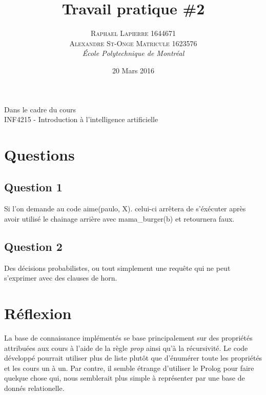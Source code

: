 \documentclass[a4paper, 12pt]{article} %
\title{Travail pratique \#2}
\author{\textsc{Raphael Lapierre 1644671\\
	        Alexandre St-Onge Matricule 1623576} %
\vspace{10pt}
\\{\textit{École Polytechnique de Montréal}}} %
\date{20 Mars 2016} %
\makeatletter
\renewcommand{\maketitle}{ %
\begin{center} %

\vspace*{25pt} %
{\LARGE\@title} %

\vspace{125pt} %

{\large\@author} %

\vspace{125pt} %
Dans le cadre du cours
\\INF4215 - Introduction à l'intelligence artificielle
\vspace{125pt} %
\\\@date %
\vspace{125pt} %

\end{center}
}
\makeatother
\begin{document}
\thispagestyle{empty}
\clearpage\maketitle %
\pagebreak[4]

\setlength{\headheight}{15.0pt}
\pagestyle{fancy}
\fancyhead[C]{}

\section*{Questions}
\subsection*{Question 1}
Si l'on demande au code aime(paulo, X). celui-ci arrêtera de s'éxécuter après avoir utilisé
le chainage arrière avec mama\_burger(b) et retournera faux.

\subsection*{Question 2}
Des décisions probabilistes, ou tout simplement une requête qui ne peut s'exprimer avec des 
clauses de horn. 

\section{Réflexion}
La base de connaissance implémentés se base principalement sur des propriétés attribuées aux
cours à l'aide de la règle \textit{prop} ainsi qu'à la récursivité. Le code développé pourrait
utiliser plus de liste plutôt que d'énumérer toute les propriétés et les cours un à un. Par contre,
il semble étrange d'utiliser le Prolog pour faire quelque chose qui, nous semblerait plus simple à 
représenter par une base de donnés relationelle.

\end{document}
